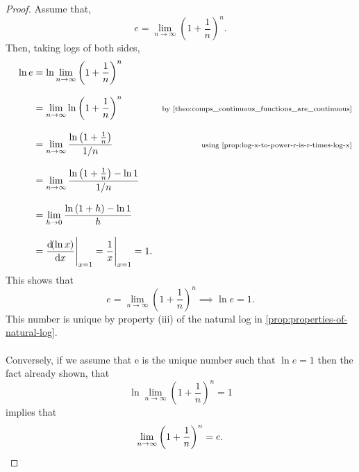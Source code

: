 \documentclass[../MathsNotesBase.tex]{subfiles}
\begin{document}
{	\bigskip\bigskip
	\begin{proof} Assume that,
		\[ e = \lim_{n \to \infty} \left(1 + \frac{1}{n}\right)^n. \]
		Then, taking logs of both sides,
		\begin{align*}
		&& \ln{e} &= \ln{\lim_{n \to \infty} \left(1 + \frac{1}{n}\right)^n} \\[8pt]
		&&  &= \lim_{n \to \infty} \ln{\left(1 + \frac{1}{n}\right)^n} &\sidecomment{by \autoref{theo:comps_continuous_functions_are_continuous}} \\[8pt]
		&&  &= \lim_{n \to \infty} \frac{\ln{\left(1 + \frac{1}{n}\right)}}{1/n} &\sidecomment{using \autoref{prop:log-x-to-power-r-is-r-times-log-x}} \\[8pt]
		&&  &= \lim_{n \to \infty} \frac{\ln{\left(1 + \frac{1}{n}\right)} - \ln{1}}{1/n} &\sidecomment{} \\[8pt]
		&&  &= \lim_{h \to 0} \frac{\ln{\left(1 + h\right)} - \ln{1}}{h} &\sidecomment{} \\[8pt]
		&&  &= \eval{\frac{\dif(\ln{x})}{\dif x}}_{x=1} = \eval{\frac{1}{x}}_{x=1} = 1. &\sidecomment{}
		\end{align*}
		This shows that 
		\[ e = \lim_{n \to \infty} \left(1 + \frac{1}{n}\right)^n \implies \ln{e} = 1. \]
		This number is unique by property (iii) of the natural log in \autoref{prop:properties-of-natural-log}.\\\\
		
		Conversely, if we assume that e is the unique number such that ${ \ln{e} = 1 }$ then the fact already shown, that 
		\[ \ln{\lim_{n \to \infty} \left(1 + \frac{1}{n}\right)^n} = 1 \]
		implies that 
		\[ \lim_{n \to \infty} \left(1 + \frac{1}{n}\right)^n = e. \qedhere\]
	\end{proof}

	\bigskip\bigskip\bigskip
}
\end{document}
